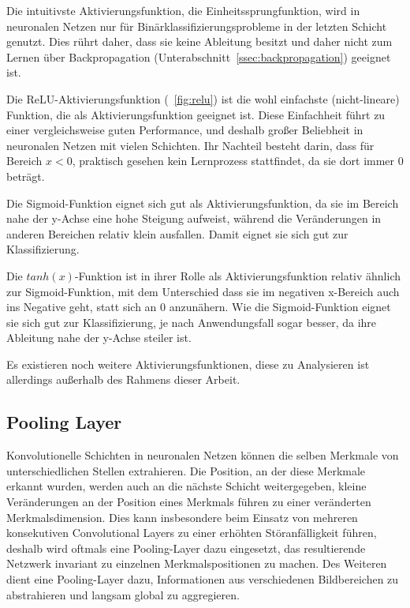 Die intuitivste Aktivierungsfunktion, die Einheitssprungfunktion, wird in neuronalen Netzen nur für Binärklassifizierungsprobleme in der letzten Schicht genutzt. Dies rührt daher, dass sie keine Ableitung besitzt und daher nicht zum Lernen über Backpropagation (\vgl Unterabschnitt~\ref{ssec:backpropagation}) geeignet ist.

Die ReLU-Aktivierungsfunktion (\vgl \figurename~\ref{fig:relu}) ist die wohl einfachste (nicht-lineare) Funktion, die als Aktivierungsfunktion geeignet ist. Diese Einfachheit führt zu einer vergleichsweise guten Performance, und deshalb großer Beliebheit in neuronalen Netzen mit vielen Schichten. Ihr Nachteil besteht darin, dass für Bereich $x<0$, praktisch gesehen kein Lernprozess stattfindet, da sie dort immer $0$ beträgt. \cite{kizrak_19}

Die Sigmoid-Funktion eignet sich gut als Aktivierungsfunktion, da sie im Bereich nahe der y-Achse eine hohe Steigung aufweist, während die Veränderungen in anderen Bereichen relativ klein ausfallen. Damit eignet sie sich gut zur Klassifizierung. \cite{kizrak_19}

Die $tanh(x)$-Funktion ist in ihrer Rolle als Aktivierungsfunktion relativ ähnlich zur Sigmoid-Funktion, mit dem Unterschied dass sie im negativen x-Bereich auch ins Negative geht, statt sich an $0$ anzunähern. Wie die Sigmoid-Funktion eignet sie sich gut zur Klassifizierung, je nach Anwendungsfall sogar besser, da ihre Ableitung nahe der y-Achse steiler ist. \cite{kizrak_19}

Es existieren noch weitere Aktivierungsfunktionen, diese zu Analysieren ist allerdings außerhalb des Rahmens dieser Arbeit.

\subsection{Pooling Layer}
\label{ssec:pooling}

Konvolutionelle Schichten in neuronalen Netzen können die selben Merkmale von unterschiedlichen Stellen extrahieren. Die Position, an der diese Merkmale erkannt wurden, werden auch an die nächste Schicht weitergegeben, \dahe kleine Veränderungen an der Position eines Merkmals führen zu einer veränderten Merkmalsdimension. \cite{brownlee_19} Dies kann insbesondere beim Einsatz von mehreren konsekutiven Convolutional Layers zu einer erhöhten Störanfälligkeit führen, deshalb wird oftmals eine Pooling-Layer dazu eingesetzt, das resultierende Netzwerk invariant zu einzelnen Merkmalspositionen zu machen. Des Weiteren dient eine Pooling-Layer dazu, Informationen aus verschiedenen Bildbereichen zu abstrahieren und langsam global zu aggregieren. \cite{deeplearning_16}

